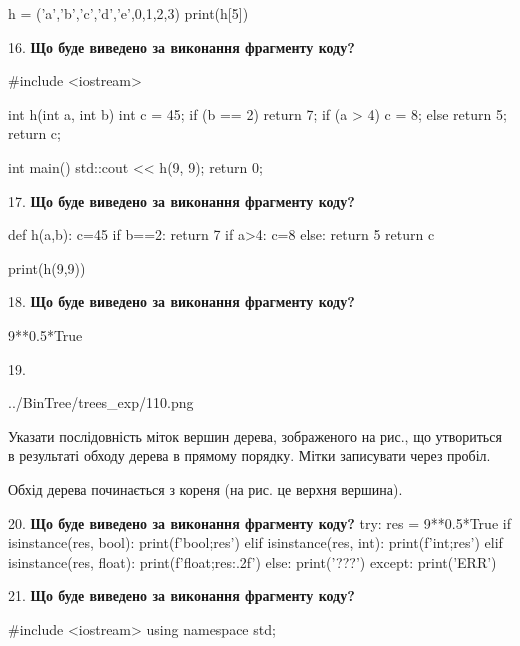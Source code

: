 \documentclass[11pt]{article}
\begin{document}
h = ('a','b','c','d','e',0,1,2,3)
print(h[5])

\par\vspace{5mm}
16. \textbf{Що буде виведено за виконання фрагменту коду?}

#include <iostream>

int h(int a, int b){
    int c = 45;
    if (b == 2)
        return 7;
    if (a > 4)
         c = 8;
    else 
        return 5;
    return c;
}

int main(){
    std::cout << h(9, 9);
    return 0;
}
\par\vspace{5mm}
17. \textbf{Що буде виведено за виконання фрагменту коду?}

def h(a,b):
    c=45
    if b==2:
        return 7
    if a>4:
         c=8
    else: 
        return 5
    return c

print(h(9,9))\par\vspace{5mm}
18. \textbf{Що буде виведено за виконання фрагменту коду?}

9**0.5*True
\par\vspace{5mm}
19. 

\begin{center}
	{../BinTree/trees_exp/110.png}
\end{center}
Указати послідовність міток вершин дерева, зображеного на рис., що утвориться в результаті обходу дерева в прямому порядку. Мітки записувати через пробіл.\par Обхід дерева починається з кореня (на рис. це верхня вершина).
\par\vspace{5mm}
20. \textbf{Що буде виведено за виконання фрагменту коду?}
try:
    res = 9**0.5*True
    if isinstance(res, bool):
        print(f'bool;{res}')
    elif isinstance(res, int):
        print(f'int;{res}')
    elif isinstance(res, float):
        print(f'float;{res:.2f}')
    else:
        print('???')
except:
    print('ERR')
\par\vspace{5mm}
21. \textbf{Що буде виведено за виконання фрагменту коду?}

#include <iostream>
using namespace std;
\end{document}
